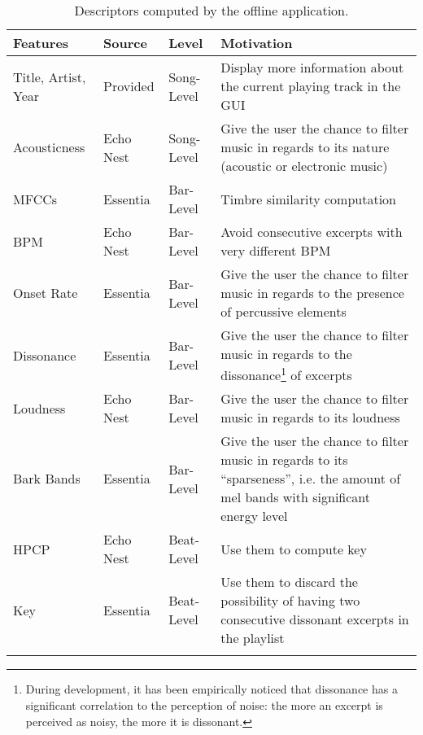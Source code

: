 \begin{center} 
\begin{longtable}{ p{}  p{}  p{}  p{} } 
\textbf{Features} & \textbf{Source} & \textbf{Level} & \textbf{Motivation} \\ \toprule
Title, Artist, Year & Provided & Song-Level & Display more information about the current playing track in the GUI \\ \midrule
Acousticness & Echo Nest & Song-Level & Give the user the chance to filter music in regards to its nature (acoustic or electronic music) \\ \midrule
MFCCs & Essentia & Bar-Level & Timbre similarity computation \\ \midrule
BPM & Echo Nest & Bar-Level & Avoid consecutive excerpts with very different BPM \\ \midrule
Onset Rate & Essentia & Bar-Level & Give the user the chance to filter music in regards to the presence of percussive elements \\ \midrule
Dissonance & Essentia & Bar-Level & Give the user the chance to filter music in regards to the dissonance\footnote{During development, it has been empirically noticed that dissonance has a significant correlation to the perception of noise: the more an excerpt is perceived as noisy, the more it is dissonant.} of excerpts \\ \midrule
Loudness & Echo Nest & Bar-Level & Give the user the chance to filter music in regards to its loudness \\ \midrule
Bark Bands & Essentia & Bar-Level & Give the user the chance to filter music in regards to its ``sparseness'', i.e. the amount of mel bands with significant energy level \\ \midrule
HPCP & Echo Nest & Beat-Level & Use them to compute key \\ \midrule
Key & Essentia & Beat-Level & Use them to discard the possibility of having two consecutive dissonant excerpts in the playlist \\ \bottomrule
\caption[List of descriptors computed offline]{Descriptors computed by the offline application.}
\label{table:offlinedescriptors}
\end{longtable}
\end{center}


